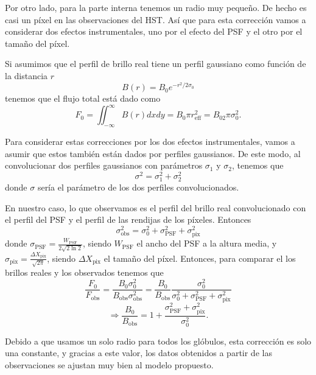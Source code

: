 \documentclass{book}
\begin{document}
Por otro lado, para la parte interna tenemos un radio muy pequeño. De
hecho es casi un píxel en las observaciones del HST. Así que para esta
corrección vamos a considerar dos efectos instrumentales, uno por el
efecto del PSF y el otro por el tamaño del píxel.

Si asumimos que el perfil de brillo real tiene un perfil gaussiano
como función de la distancia $r$
\begin{equation}
B(r)= B_0 e^{-r^2/2\sigma_0}
\end{equation} 
tenemos que el flujo total está dado como 
\begin{equation}
F_0=\iint_{-\infty}^\infty B(r)dxdy=B_0 \pi r_\mathrm{eff}^2=B_02\pi \sigma_0^2.
\end{equation}

Para considerar estas correcciones por los dos efectos instrumentales,
vamos a asumir que estos también están dados por perfiles gaussianos.
De este modo, al convolucionar dos perfiles gaussianos con parámetros
$\sigma_1$ y $\sigma_2$, tenemos que
\begin{equation}
\sigma^2=\sigma_1^2+\sigma_2^2
\end{equation}
donde $\sigma$ sería el parámetro de los dos perfiles convolucionados.

En nuestro caso, lo que observamos es el perfil del brillo real
convolucionado con el perfil del PSF y el perfil de las rendijas de
los píxeles. Entonces
\begin{equation}
\sigma_\mathrm{obs}^2=\sigma_0^2+\sigma_\mathrm{PSF}^2+\sigma_\mathrm{pix}^2
\end{equation}
donde $\sigma_\mathrm{PSF}=\frac{W_\mathrm{PSF}}{2\sqrt{2\ln{2}}}$, siendo
$W_\mathrm{PSF}$ el ancho del PSF a la altura media, y
$\sigma_\mathrm{pix}=\frac{\Delta X_\mathrm{pix}}{\sqrt{2\pi}}$, siendo
$\Delta X_\mathrm{pix}$ el tamaño del píxel. Entonces, para comparar el los
brillos reales y los observados tenemos que
\begin{equation}
\frac{F_0}{F_\mathrm{obs}}=\frac{B_0\sigma_0^2}{B_\mathrm{obs}\sigma_\mathrm{obs}^2}=\frac{B_0}{B_\mathrm{obs}}\frac{\sigma_0^2}{\sigma_0^2+\sigma_\mathrm{PSF}^2+\sigma_\mathrm{pix}^2}
\end{equation} 
\begin{equation}
\Rightarrow \frac{B_0}{B_\mathrm{obs}}=1+\frac{\sigma_\mathrm{PSF}^2+\sigma_\mathrm{pix}^2}{\sigma_0^2}.
\end{equation}

Debido a que usamos un solo radio para todos los glóbulos, esta
corrección es solo una constante, y gracias a este valor, los datos
obtenidos a partir de las observaciones se ajustan muy bien al modelo
propuesto.
\end{document}

